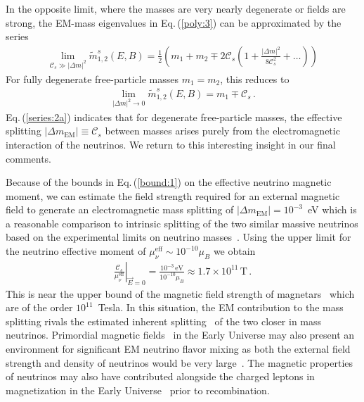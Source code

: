 \documentclass{ws-ijmpa}
\newcommand{\req}[1]{Eq.\,(\ref{#1})}
\begin{document}
In the opposite limit, where the masses are very nearly degenerate or fields are strong, the EM-mass eigenvalues in \req{poly:3} can be approximated by the series
\begin{align}
\label{series:2}
\lim_{\mathcal{C}_{s}\gg|\Delta m|^{2}}\widetilde m_{1,2}^{s}(E,B)=\frac{1}{2}\left(m_{1}+m_{2}\mp2\mathcal{C}_{s}\left(1+\frac{|\Delta m|^{2}}{8\mathcal{C}_{s}^{2}}+\ldots\right)\right)
\end{align}
For fully degenerate free-particle masses $m_{1}=m_{2}$, this reduces to
\begin{align}
\label{series:2a}
\lim_{|\Delta m|^{2}\to0}\widetilde m_{1,2}^{s}(E,B)=m_{1}\mp\mathcal{C}_{s}\,.
\end{align}
\req{series:2a} indicates that for degenerate free-particle masses, the effective splitting $|\Delta m_\mathrm{EM}|\equiv\mathcal{C}_{s}$ between masses arises purely from the electromagnetic interaction of the neutrinos. We return to this interesting insight in our final comments.

Because of the bounds in \req{bound:1} on the effective neutrino magnetic moment, we can estimate the field strength required for an external magnetic field to generate an electromagnetic mass splitting of $|\Delta m_\mathrm{EM}|=10^{-3}$~eV which is a reasonable comparison to intrinsic splitting of the two similar massive neutrinos based on the experimental limits on neutrino masses~\cite{ParticleDataGroup:2022pth}. Using the upper limit for the neutrino effective moment of $\mu_{\nu}^\mathrm{eff}\sim10^{-10}\mu_{B}$ we obtain
\begin{align}
\label{estimate:1}
\left.\frac{\mathcal{C}_{s}}{\mu_{\nu}^\mathrm{eff}}\right\rvert_{\vec{E}=0}=\frac{10^{-3}\,\mathrm{eV}}{10^{-10}\mu_{B}}\approx1.7\times10^{11}\,\mathrm{T}\,.
\end{align}
This is near the upper bound of the magnetic field strength of magnetars~\cite{Kaspi:2017fwg} which are of the order $10^{11}$~Tesla. In this situation, the EM contribution to the mass splitting rivals the estimated inherent splitting~\cite{ParticleDataGroup:2022pth} of the two closer in mass neutrinos. Primordial magnetic fields~\cite{Grasso:2000wj} in the Early Universe may also present an environment for significant EM neutrino flavor mixing as both the external field strength and density of neutrinos would be very large~\cite{Rafelski:2023emw}. The magnetic properties of neutrinos may also have contributed alongside the charged leptons in magnetization in the Early Universe~\cite{Steinmetz:2023nsc} prior to recombination. 
\end{document}
